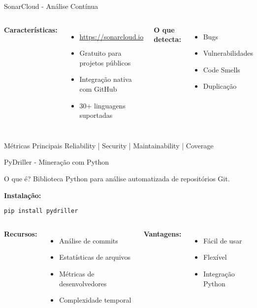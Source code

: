 \documentclass[aspectratio=169,11pt]{beamer}
\begin{document}
\begin{frame}{SonarCloud - Análise Contínua}
\begin{columns}[T]
\textbf{Características:}
\begin{itemize}
    \item \url{https://sonarcloud.io}
    \item Gratuito para projetos públicos
    \item Integração nativa com GitHub
    \item 30+ linguagens suportadas
\end{itemize}

\textbf{O que detecta:}
\begin{itemize}
    \item {} Bugs
    \item {} Vulnerabilidades
    \item {} Code Smells
    \item {} Duplicação
\end{itemize}
\end{columns}

\begin{block}{Métricas Principais}
Reliability | Security | Maintainability | Coverage
\end{block}
\end{frame}

\begin{frame}[fragile]{PyDriller - Mineração com Python}
\begin{block}{O que é?}
Biblioteca Python para análise automatizada de repositórios Git.
\end{block}

\textbf{Instalação:}
\begin{lstlisting}[style=yamlcode,basicstyle=\ttfamily\footnotesize]
pip install pydriller
\end{lstlisting}

\begin{columns}[T]
\textbf{Recursos:}
\begin{itemize}
    \item Análise de commits
    \item Estatísticas de arquivos
    \item Métricas de desenvolvedores
    \item Complexidade temporal
\end{itemize}

\textbf{Vantagens:}
\begin{itemize}
    \item Fácil de usar
    \item Flexível
    \item Integração Python
\end{itemize}
\end{columns}
\end{frame}
\end{document}
